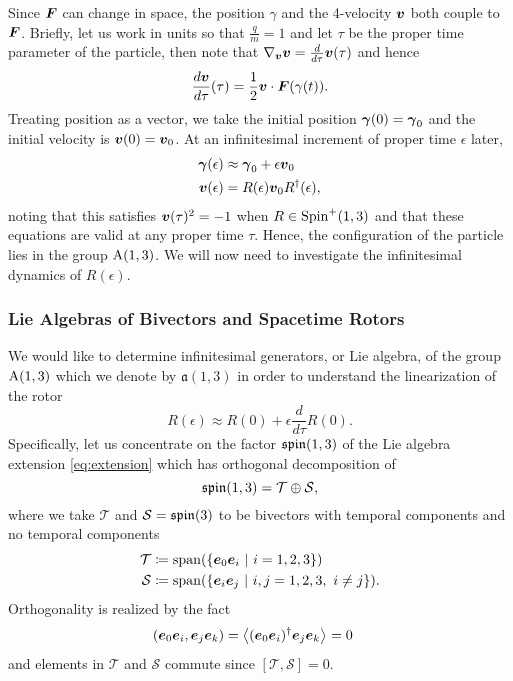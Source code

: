 \documentclass{article}
\begin{document}
Since $\boldsymbol{F}$ can change in space, the position $\gamma$ and the 4-velocity $\boldsymbol{v}$ both couple to $\boldsymbol{F}$. Briefly, let us work in units so that $\frac{q}{m}=1$ and let $\tau$ be the proper time parameter of the particle, then note that $\nabla_{\boldsymbol{v}}\boldsymbol{v}=\frac{d}{d\tau} \boldsymbol{v}(\tau)$ and hence
\begin{equation}
    \label{eq:faraday_transport}
    \frac{d\boldsymbol{v}}{d\tau} (\tau) = \frac{1}{2} \boldsymbol{v}\cdot \boldsymbol{F}(\gamma(t)).
\end{equation}
Treating position as a vector, we take the initial position $\boldsymbol{\gamma}(0)=\boldsymbol{\gamma}_0$ and the initial velocity is $\boldsymbol{v}(0)=\boldsymbol{v}_0$. At an infinitesimal increment of proper time $\epsilon$ later,
\begin{align}
\label{eq:linearization_position}
\boldsymbol{\gamma}(\epsilon) &\approx \boldsymbol{\gamma}_0+\epsilon\boldsymbol{v}_0\\
\boldsymbol{v}(\epsilon) &=  R(\epsilon)\boldsymbol{v}_0 R^\dagger(\epsilon),
\end{align}
noting that this satisfies $\boldsymbol{v}(\tau)^2=-1$ when $R\in \operatorname{Spin}^+(1,3)$ and that these equations are valid at any proper time $\tau$. Hence, the configuration of the particle lies in the group $\operatorname{A}(1,3)$. We will now need to investigate the infinitesimal dynamics of $R(\epsilon)$.

\subsubsection{Lie Algebras of Bivectors and Spacetime Rotors}

We would like to determine infinitesimal generators, or Lie algebra, of the group $\operatorname{A}(1,3)$ which we denote by $\mathfrak{a}(1,3)$ in order to understand the linearization of the rotor
\begin{equation}
\label{eq:linearization_rotor}
R(\epsilon) \approx R(0)+\epsilon\frac{d}{d\tau}R(0).
\end{equation}
Specifically, let us concentrate on the factor $\mathfrak{spin}(1,3)$ of the Lie algebra extension \cref{eq:extension} which has orthogonal decomposition of 
\begin{equation}
    \label{eq:spin_algebra_split}
    \mathfrak{spin}(1,3) = \mathcal{T} \oplus \mathcal{S},
\end{equation}
where we take $\mathcal{T}$ and $\mathcal{S}=\mathfrak{spin}(3)$ to be bivectors with temporal components and no temporal components
\begin{align}
    \mathcal{T} &\coloneqq \mathrm{span}(\{\boldsymbol{e}_0 \boldsymbol{e}_i ~\vert~ i = 1,2,3\})\\
    \mathcal{S} &\coloneqq \mathrm{span}(\{\boldsymbol{e}_i \boldsymbol{e}_j ~\vert~ i,j = 1,2,3, ~ i\neq j\}).
\end{align}
Orthogonality is realized by the fact
\begin{align}
    (\boldsymbol{e}_0 \boldsymbol{e}_i, \boldsymbol{e}_j \boldsymbol{e}_k) &= \left\langle(\boldsymbol{e}_0 \boldsymbol{e}_i)^\dagger \boldsymbol{e}_j \boldsymbol{e}_k\right\rangle_{} = 0
\end{align}
and elements in $\mathcal{T}$ and $\mathcal{S}$ commute since $[\mathcal{T},\mathcal{S}]=0$.
\end{document}
